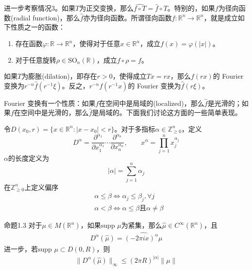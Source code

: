\documentclass[lang = cn, %
scheme = chinese          %
]
{elegantbook}             %
\newcommand{\R}{\mathbb{R}}            %
\newcommand{\Z}{\mathbb{Z}}            %
\newcommand{\sub}{\subset}             %
\newcommand{\supp}{\text{supp }}
\begin{document}
进一步考察情况3。如果$T$为正交变换，那么$\widehat{f\circ T}=\widehat{f}\circ T$。特别的，如果$f$为径向函数(radial function)，那么$\widehat{f}$亦为径向函数。所谓径向函数$f:\R^n\to\R^n$，就是成立如下性质之一的函数：
\begin{enumerate}
	\item 存在函数$\varphi:\R\to\R^n$，使得对于任意$x\in\R^n$，成立$f(x)=\varphi(|x|)$。
	\item 对于任意旋转$\rho\in\text{SO}_n(\R)$，成立$f\circ\rho=f$。
\end{enumerate}
如果$T$为膨胀(dilation)，即存在$r>0$，使得成立$Tx=rx$，那么$f(rx)$的 Fourier 变换为$r^{-n}\widehat{f}(r^{-1}\xi)$。反之，$r^{-n}f(r^{-1}x)$的 Fourier 变换为$\widehat{f}(r\xi)$。

Fourier 变换有一个性质：如果$f$在空间中是局域的(localized)，那么$\widehat{f}$是光滑的；如果$f$在空间中是光滑的，那么$\widehat{f}$是局域的。下面我们讨论这方面的一些简单表现。

令$D(x_0,r)=\{ x\in\R^n:|x-x_0|<r \}$。对于多指标$\alpha\in\Z_{\ge 0}^n$，定义
\[
D^\alpha=\frac{\partial^{\alpha_1}}{\partial x_1^{\alpha_1}}\cdots \frac{\partial^{\alpha_n}}{\partial x_n^{\alpha_n}},\qquad
x^\alpha=\prod_{j=1}^{n}x_j^{\alpha_j}
\]
$\alpha$的长度定义为
\[
|\alpha|=\sum_{j=1}^{n}\alpha_j
\]
在$\Z_{\ge 0}^n$上定义偏序
\begin{align*}
	& \alpha\le\beta \iff \alpha_j\le \beta_j,\forall j \\
	& \alpha<\beta \iff \alpha\le\beta\text{且}\alpha\ne\beta
\end{align*}

\begin{proposition}{}{命题1.3}
	对于$\mu\in M(\R^n)$，如果$\supp \mu$为紧集，那么$\widehat{\mu}\in C^{\infty}(\R^n)$，且
	\begin{gather}
		\label{7式}
		D^{\alpha}(\widehat{\mu})
		=\widehat{(-2\pi i x)^{\alpha}\mu}
	\end{gather}
	进一步，若$\supp \mu\sub D(0,R)$，则
	\begin{gather}
		\label{8式}
		\|D^{\alpha}(\widehat{\mu})\|_{\infty}
		\le (2\pi R)^{|\alpha|}\|\mu\|
	\end{gather}
\end{proposition}
\end{document}
